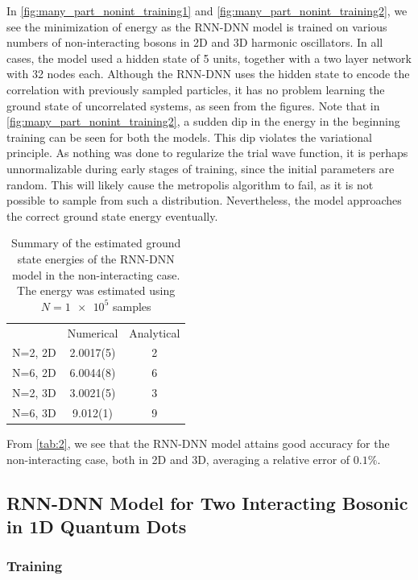 In \autoref{fig:many_part_nonint_training1} and
\autoref{fig:many_part_nonint_training2}, we see the minimization of energy as
the RNN-DNN model is trained on various numbers of non-interacting bosons in 2D
and 3D harmonic oscillators. In all cases, the model used a hidden state of 5
units, together with a two layer network with 32 nodes each. Although the
RNN-DNN uses the hidden state to encode the correlation with previously sampled
particles, it has no problem learning the ground state of uncorrelated systems,
as seen from the figures. Note that in
\autoref{fig:many_part_nonint_training2}, a sudden dip in the energy in the
beginning training can be seen for both the models. This dip violates the
variational principle. As nothing was done to regularize the trial wave
function, it is perhaps unnormalizable during early stages of training, since
the initial parameters are random. This will likely cause the metropolis
algorithm to fail, as it is not possible to sample from such a distribution.
Nevertheless, the model approaches the correct ground state energy eventually. 

\begin{table}[ht]
	\begin{tabular}{l|SS}
		\toprule
		& {Numerical}& {Analytical}     \\
		N=2, 2D    & 2.0017(5) &  2 \\
		N=6, 2D    & 6.0044(8) &  6 \\
		N=2, 3D    & 3.0021(5) &  3 \\
		N=6, 3D    & 9.012(1)  &  9 \\
		\bottomrule
	\end{tabular}
	\caption{Summary of the estimated ground state energies of the RNN-DNN model
      in the non-interacting case. The energy was estimated using $N=\num{1e5}$
      samples} 
	\label{tab:2}
\end{table}

From \autoref{tab:2}, we see that the RNN-DNN model attains good accuracy for the non-interacting case, both in 2D and 3D, averaging a relative error of $0.1\%$.

\subsection{RNN-DNN Model for Two Interacting Bosonic in 1D Quantum Dots}
\subsubsection{Training}

